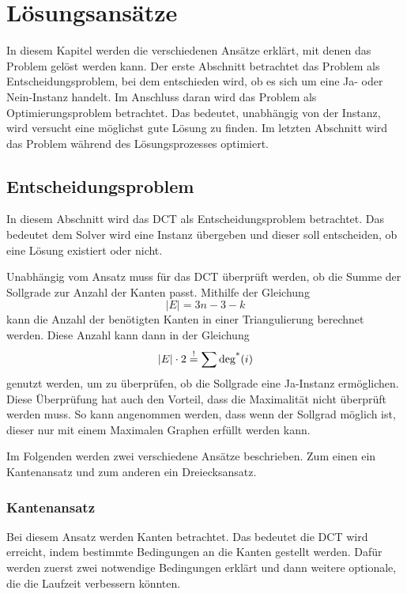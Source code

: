


\chapter{Lösungsansätze}
\label{chap:theoretischer_hintergrund}
In diesem Kapitel werden die verschiedenen Ansätze erklärt, mit denen das Problem gelöst werden kann.
Der erste Abschnitt betrachtet das Problem als Entscheidungsproblem, bei dem entschieden wird, ob es sich um eine Ja- oder Nein-Instanz handelt.
Im Anschluss daran wird das Problem als Optimierungsproblem betrachtet.
Das bedeutet, unabhängig von der Instanz, wird versucht eine möglichst gute Lösung zu finden.
Im letzten Abschnitt wird das Problem während des Lösungsprozesses optimiert.

\section{Entscheidungsproblem}
In diesem Abschnitt wird das DCT als Entscheidungsproblem betrachtet.
Das bedeutet dem Solver wird eine Instanz übergeben und dieser soll entscheiden, ob eine Lösung existiert oder nicht.

Unabhängig vom Ansatz muss für das DCT überprüft werden, ob die Summe der Sollgrade zur Anzahl der Kanten passt.
Mithilfe der Gleichung \[
\left| E \right| = 3 n - 3 - k
\]
kann die Anzahl der benötigten Kanten in einer Triangulierung berechnet werden.
Diese Anzahl kann dann in der Gleichung \[
\left| E \right| \cdot 2 \overset{!}{=} \sum \operatorname{deg^*}(i)
\] genutzt werden, um zu überprüfen, ob die Sollgrade eine Ja-Instanz ermöglichen.
Diese Überprüfung hat auch den Vorteil, dass die Maximalität nicht überprüft werden muss.
So kann angenommen werden, dass wenn der Sollgrad möglich ist, dieser nur mit einem Maximalen Graphen erfüllt werden kann.

Im Folgenden werden zwei verschiedene Ansätze beschrieben.
Zum einen ein Kantenansatz und zum anderen ein Dreiecksansatz.

\subsection{Kantenansatz}
Bei diesem Ansatz werden Kanten betrachtet. 
Das bedeutet die DCT wird erreicht, indem bestimmte Bedingungen an die Kanten gestellt werden.
Dafür werden zuerst zwei notwendige Bedingungen erklärt und dann weitere optionale, die die Laufzeit verbessern könnten.
